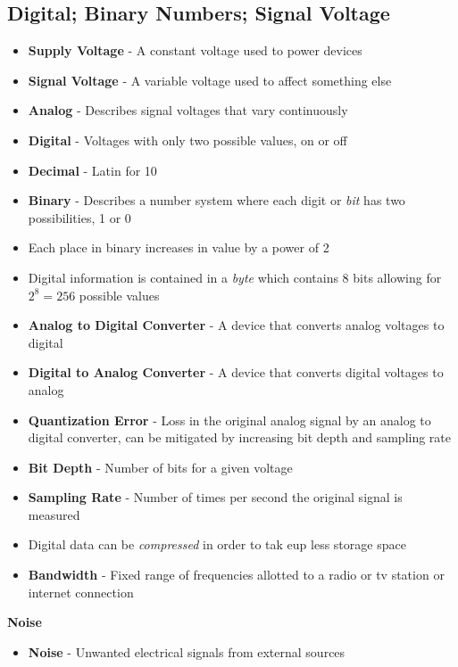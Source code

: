 \subsection{Digital; Binary Numbers; Signal Voltage}
\begin{itemize}
    \item \textbf{Supply Voltage} - A constant voltage used to power devices
    \item \textbf{Signal Voltage} - A variable voltage used to affect something else
    \item \textbf{Analog} - Describes signal voltages that vary continuously
    \item \textbf{Digital} - Voltages with only two possible values, on or off
    \item \textbf{Decimal} - Latin for 10
    \item \textbf{Binary} - Describes a number system where each digit or \emph{bit} has two possibilities, 1 or 0
    \item Each place in binary increases in value by a power of 2
    \item Digital information is contained in a \emph{byte} which contains 8 bits allowing for \(2^8=256\) possible values
    \item \textbf{Analog to Digital Converter} - A device that converts analog voltages to digital 
    \item\textbf{Digital to Analog Converter} - A device that converts digital voltages to analog 
    \item \textbf{Quantization Error} - Loss in the original analog signal by an analog to digital converter, can be mitigated by increasing bit depth and sampling rate
    \item \textbf{Bit Depth} - Number of bits for a given voltage
    \item \textbf{Sampling Rate} - Number of times per second the original signal is measured
    \item Digital data can be \emph{compressed} in order to tak eup less storage space
    \item \textbf{Bandwidth} - Fixed range of frequencies allotted to a radio or tv station or internet connection
\end{itemize}

\textbf{Noise}
\begin{itemize}
    \item \textbf{Noise} - Unwanted electrical signals from external sources
\end{itemize}

